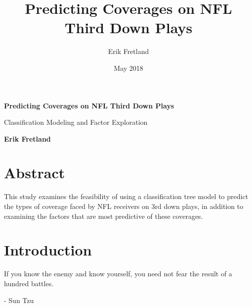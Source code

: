 \documentclass{article}
\begin{document}
\begin{titlepage}
    \begin{center}
        \vspace*{1cm}
        
        \Huge
        \textbf{Predicting Coverages on NFL Third Down Plays}
        
        \vspace{0.5cm}
        \large
        Classification Modeling and Factor Exploration
        
        \vspace{1.5cm}
        
        \huge
        \textbf{Erik Fretland}
        
        \vfill
        
     
        
        \vspace{0.8cm}
        
        
        
     
    \end{center}
\end{titlepage}


\title{Predicting Coverages on NFL Third Down Plays}
\author{Erik Fretland}
\date{May 2018}



\maketitle


\section{Abstract}

This study examines the feasibility of using a classification tree model to predict the types of coverage faced by NFL receivers on 3rd down plays, in addition to examining the factors that are most predictive of these coverages.




\section{Introduction}

If you know the enemy and know yourself, you need not fear the result of a hundred battles.

- Sun Tzu
\end{document}
